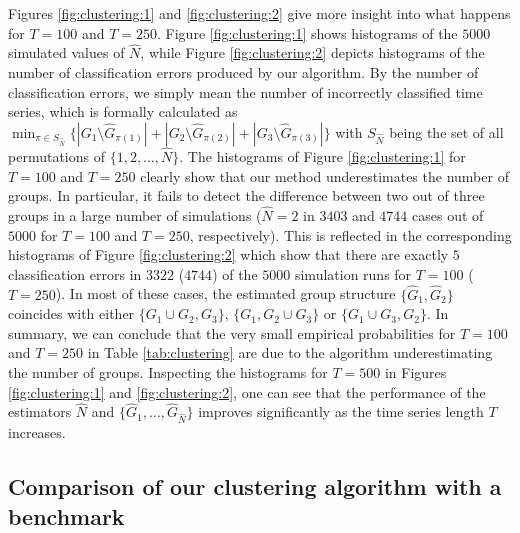 \documentclass[12pt]{article}
\begin{document}
Figures \ref{fig:clustering:1} and \ref{fig:clustering:2} give more insight into what happens for $T=100$ and $T=250$. Figure \ref{fig:clustering:1} shows histograms of the $5000$ simulated values of $\widehat{N}$, while Figure \ref{fig:clustering:2} depicts histograms of the number of classification errors produced by our algorithm. By the number of classification errors, we simply mean the number of incorrectly classified time series, which is formally calculated as 
$\min_{\pi \in S_{\widehat{N}}} \big\{ |G_1 \setminus \widehat{G}_{\pi(1)}| +|G_2 \setminus \widehat{G}_{\pi(2)}| + |G_3 \setminus \widehat{G}_{\pi(3)}| \big\}$
with $S_{\widehat{N}}$ being the set of all permutations of $\{1, 2, \ldots, \widehat{N}\}$. The histograms of Figure \ref{fig:clustering:1} for $T=100$ and $T = 250$ clearly show that our method underestimates the number of groups. In particular, it fails to detect the difference between two out of three groups in a large number of simulations ($\widehat{N} = 2$ in $3403$ and $4744$ cases out of $5000$ for $T= 100$ and $T=250$, respectively). This is reflected in the corresponding histograms of Figure \ref{fig:clustering:2} which show that there are exactly $5$ classification errors in $3322$ ($4744$) of the $5000$ simulation runs for $T=100$ ($T=250$). In most of these cases, the estimated group structure $\{ \widehat{G}_1, \widehat{G}_{2}\}$ coincides with either $\{ G_1 \cup G_2,G_3\}$,  $\{ G_1, G_2\cup G_3\}$ or $ \{ G_1 \cup G_3,G_2\}$. In summary, we can conclude that the very small empirical probabilities for $T=100$ and $T=250$ in Table \ref{tab:clustering} are due to the algorithm underestimating the number of groups. Inspecting the histograms for $T=500$ in Figures \ref{fig:clustering:1} and \ref{fig:clustering:2}, one can see that the performance of the estimators $\widehat{N}$ and $\{ \widehat{G}_1,\ldots, \widehat{G}_{\widehat{N}} \}$ improves significantly as the time series length $T$ increases. %


\subsection{Comparison of our clustering algorithm with a benchmark}
\end{document}
